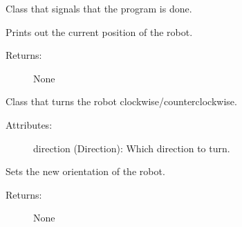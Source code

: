 \documentclass[letterpaper,10pt,english]{sphinxmanual}
\begin{document}
\begin{fulllineitems}
\label{\detokenize{statements:robol_lang.statements.Stop}}
\sphinxAtStartPar
Class that signals that the program is done.

\begin{fulllineitems}
\label{\detokenize{statements:robol_lang.statements.Stop.interpret}}
\sphinxAtStartPar
Prints out the current position of the robot.
\begin{description}
\item[{Returns:}] \leavevmode
\sphinxAtStartPar
None

\end{description}

\end{fulllineitems}


\end{fulllineitems}


\begin{fulllineitems}
\label{\detokenize{statements:robol_lang.statements.Turn}}
\sphinxAtStartPar
Class that turns the robot clockwise/counterclockwise.
\begin{description}
\item[{Attributes:}] \leavevmode
\sphinxAtStartPar
direction (Direction): Which direction to turn.

\end{description}

\begin{fulllineitems}
\label{\detokenize{statements:robol_lang.statements.Turn.interpret}}
\sphinxAtStartPar
Sets the new orientation of the robot.
\begin{description}
\item[{Returns:}] \leavevmode
\sphinxAtStartPar
None

\end{description}

\end{fulllineitems}


\end{fulllineitems}
\end{document}
